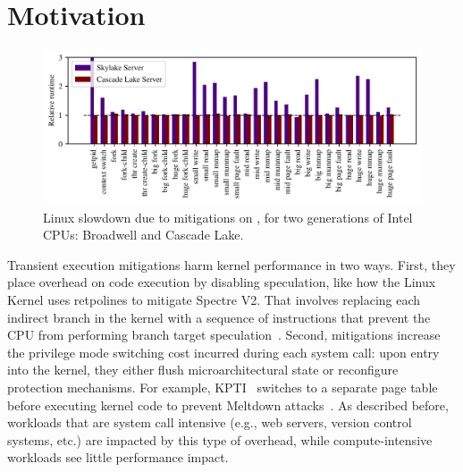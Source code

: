 \section{Motivation}
\label{s:motivation}

\begin{figure}[t]
  \begin{center}
    \includegraphics[width=\textwidth]{results/bhw2_bhw3_overhead}
  \end{center}
\vspace{-\baselineskip}
\caption{Linux slowdown due to mitigations on \bench, for two generations of Intel CPUs: Broadwell and Cascade Lake.}
\label{fig:linuxslowdown}
\end{figure}


Transient execution mitigations harm kernel performance in two
ways. First, they place overhead on code execution by disabling
speculation, like how the Linux Kernel uses retpolines to
mitigate Spectre V2. That involves replacing each indirect branch in the kernel with a
sequence of instructions that prevent the CPU from performing branch
target speculation~\cite{intel:retpoline}. Second, mitigations
increase the privilege mode switching cost incurred during each system
call: upon entry into the kernel, they either flush microarchitectural
state or reconfigure protection mechanisms.  For example,
KPTI~\cite{gruss:kaiser,linux:kpti} switches to a separate page table
before executing kernel code to prevent Meltdown
attacks~\cite{lipp:meltdown}.  As described before, workloads
that are system call intensive (e.g., web servers, version control
systems, etc.) are impacted by this type of overhead, while compute-intensive
workloads see little performance impact.

